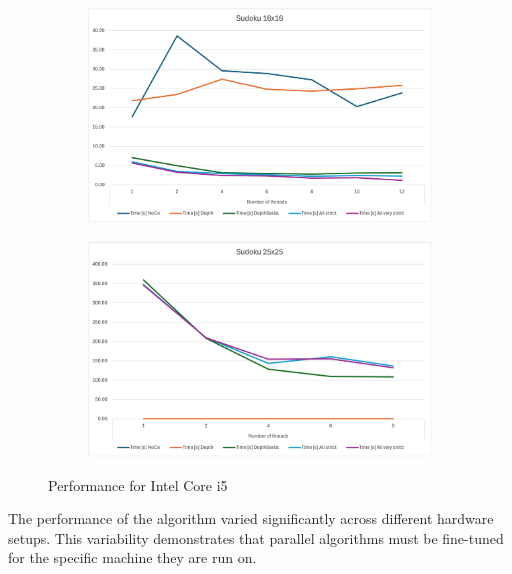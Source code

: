 \documentclass[paper=a4, fontsize=12pt]{scrartcl}
\numberwithin{equation}{section}
\numberwithin{figure}{section}
\numberwithin{table}{section}
\begin{document}
    \begin{figure}[!ht]
        \centering
        \begin{subfigure}[b]{0.49\textwidth}
            \centering
            \includegraphics[width=\textwidth]{image16.png} 
        \end{subfigure}
        \hfill
        \begin{subfigure}[b]{0.49\textwidth}
            \centering
            \includegraphics[width=\textwidth]{image25.png} 
        \end{subfigure}
        \caption{Performance for Intel Core i5}
    \end{figure}
    The performance of the algorithm varied significantly across different hardware setups.
    This variability demonstrates that parallel algorithms must be fine-tuned for the specific machine they are run on.
\end{document}
